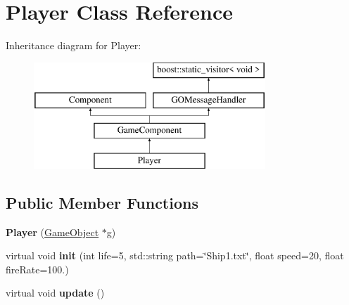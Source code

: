 \hypertarget{class_player}{}\section{Player Class Reference}
\label{class_player}
Inheritance diagram for Player\+:\begin{figure}[H]
\begin{center}
\leavevmode
\includegraphics[height=4.000000cm]{class_player}
\end{center}
\end{figure}
\subsection*{Public Member Functions}
\begin{DoxyCompactItemize}
\item 
\hypertarget{class_player_ac9e2313c9f0599f111d51b1ededc7b59}{}\label{class_player_ac9e2313c9f0599f111d51b1ededc7b59} 
{\bfseries Player} (\hyperlink{class_game_object}{Game\+Object} $\ast$g)
\item 
\hypertarget{class_player_abde7e5d5c9b248e9d151b63342a1651f}{}\label{class_player_abde7e5d5c9b248e9d151b63342a1651f} 
virtual void {\bfseries init} (int life=5, std\+::string path=\char`\"{}Ship1.\+txt\char`\"{}, float speed=20, float fire\+Rate=100.)
\item 
\hypertarget{class_player_a82c3476f3e65a4e2ac6bcd040771bdd4}{}\label{class_player_a82c3476f3e65a4e2ac6bcd040771bdd4} 
virtual void {\bfseries update} ()
\end{DoxyCompactItemize}

